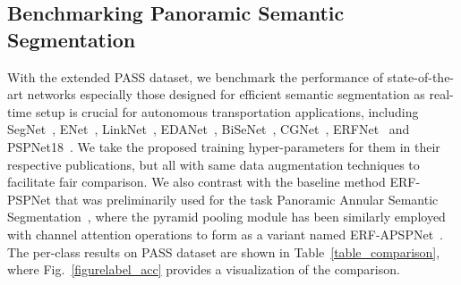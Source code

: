 \documentclass[letterpaper, 10 pt, conference]{ieeeconf}
\begin{document}
\subsection{Benchmarking Panoramic Semantic Segmentation}

With the extended PASS dataset, we benchmark the performance of state-of-the-art networks especially those designed for efficient semantic segmentation as real-time setup is crucial for autonomous transportation applications, including SegNet~\cite{badrinarayanan2017segnet}, ENet~\cite{paszke2016enet}, LinkNet~\cite{chaurasia2017linknet}, EDANet~\cite{lo2018efficient}, BiSeNet~\cite{yu2018bisenet}, CGNet~\cite{wu2018cgnet}, ERFNet~\cite{romera2019bridging} and PSPNet18~\cite{zhao2017pyramid}. We take the proposed training hyper-parameters for them in their respective publications, but all with same data augmentation techniques to facilitate fair comparison.
We also contrast with the baseline method ERF-PSPNet that was preliminarily used for the task Panoramic Annular Semantic Segmentation~\cite{yang2019can}, where the pyramid pooling module has been similarly employed with channel attention operations to form as a variant named ERF-APSPNet~\cite{yang2019pass}. The per-class results on PASS dataset are shown in Table~\ref{table_comparison}, where Fig.~\ref{figurelabel_acc} provides a visualization of the comparison.
\end{document}
